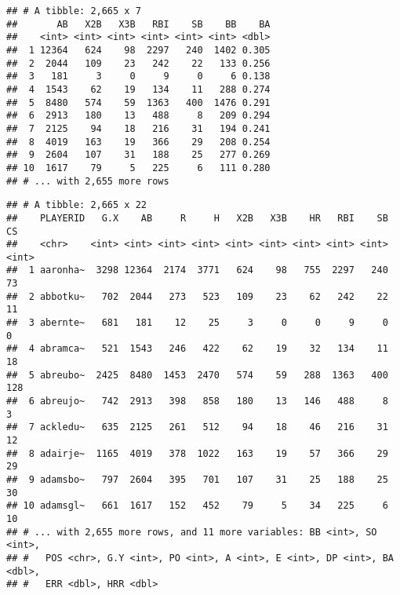 \documentclass[]{book}
\newenvironment{Shaded}{\begin{snugshade}}{\end{snugshade}}
\newcommand{\KeywordTok}[1]{\textcolor[rgb]{0.13,0.29,0.53}{\textbf{#1}}}
\newcommand{\StringTok}[1]{\textcolor[rgb]{0.31,0.60,0.02}{#1}}
\newcommand{\OperatorTok}[1]{\textcolor[rgb]{0.81,0.36,0.00}{\textbf{#1}}}
\newcommand{\NormalTok}[1]{#1}
\begin{document}
\begin{Shaded}
\end{Shaded}

\begin{verbatim}
## # A tibble: 2,665 x 7
##       AB   X2B   X3B   RBI    SB    BB    BA
##    <int> <int> <int> <int> <int> <int> <dbl>
##  1 12364   624    98  2297   240  1402 0.305
##  2  2044   109    23   242    22   133 0.256
##  3   181     3     0     9     0     6 0.138
##  4  1543    62    19   134    11   288 0.274
##  5  8480   574    59  1363   400  1476 0.291
##  6  2913   180    13   488     8   209 0.294
##  7  2125    94    18   216    31   194 0.241
##  8  4019   163    19   366    29   208 0.254
##  9  2604   107    31   188    25   277 0.269
## 10  1617    79     5   225     6   111 0.280
## # ... with 2,655 more rows
\end{verbatim}

\begin{Shaded}
\end{Shaded}

\begin{verbatim}
## # A tibble: 2,665 x 22
##    PLAYERID   G.X    AB     R     H   X2B   X3B    HR   RBI    SB    CS
##    <chr>    <int> <int> <int> <int> <int> <int> <int> <int> <int> <int>
##  1 aaronha~  3298 12364  2174  3771   624    98   755  2297   240    73
##  2 abbotku~   702  2044   273   523   109    23    62   242    22    11
##  3 abernte~   681   181    12    25     3     0     0     9     0     0
##  4 abramca~   521  1543   246   422    62    19    32   134    11    18
##  5 abreubo~  2425  8480  1453  2470   574    59   288  1363   400   128
##  6 abreujo~   742  2913   398   858   180    13   146   488     8     3
##  7 ackledu~   635  2125   261   512    94    18    46   216    31    12
##  8 adairje~  1165  4019   378  1022   163    19    57   366    29    29
##  9 adamsbo~   797  2604   395   701   107    31    25   188    25    30
## 10 adamsgl~   661  1617   152   452    79     5    34   225     6    10
## # ... with 2,655 more rows, and 11 more variables: BB <int>, SO <int>,
## #   POS <chr>, G.Y <int>, PO <int>, A <int>, E <int>, DP <int>, BA <dbl>,
## #   ERR <dbl>, HRR <dbl>
\end{verbatim}
\end{document}
